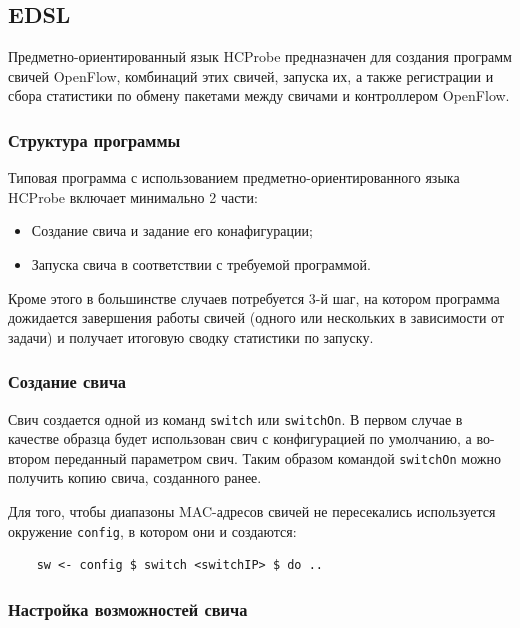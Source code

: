 \documentclass[9pt,a4paper]{article}
\begin{document}
\subsection{EDSL}

Предметно-ориентированный язык HCProbe предназначен для создания программ свичей OpenFlow,
комбинаций этих свичей, запуска их, а также регистрации и сбора статистики по обмену
пакетами между свичами и контроллером OpenFlow.

\subsubsection{Структура программы}

Типовая программа с использованием предметно-ориентированного языка HCProbe включает
минимально 2 части:

\begin{itemize}
  \item Создание свича и задание его конафигурации;
  \item Запуска свича в соответствии с требуемой программой.
\end{itemize}

Кроме этого в большинстве случаев потребуется 3-й шаг, на котором программа дожидается
завершения работы свичей (одного или нескольких в зависимости от задачи) и получает
итоговую сводку статистики по запуску.

\subsubsection{Создание свича}

Свич создается одной из команд \lstinline!switch! или \lstinline!switchOn!. В первом случае
в качестве образца будет использован свич с конфигурацией по умолчанию, а во-втором 
переданный параметром свич. Таким образом командой \lstinline!switchOn! можно получить
копию свича, созданного ранее.

Для того, чтобы диапазоны MAC-адресов свичей не пересекались используется окружение
\lstinline!config!, в котором они и создаются:

\begin{lstlisting}
    sw <- config $ switch <switchIP> $ do ..
\end{lstlisting}%

\subsubsection{Настройка возможностей свича}
\end{document}

